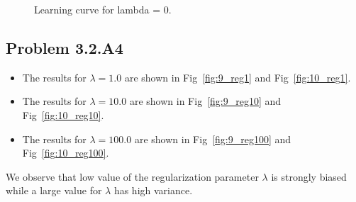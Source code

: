 \documentclass{article}
\begin{document}
\begin{figure}
  \caption{Learning curve for lambda = 0.}\label{fig:10}
\end{figure}

\subsection{Problem 3.2.A4}
\begin{itemize}
\item The results for $\lambda = 1.0$ are shown in Fig~\ref{fig:9_reg1} and Fig~\ref{fig:10_reg1}.
\item The results for $\lambda = 10.0$ are shown in Fig~\ref{fig:9_reg10} and Fig~\ref{fig:10_reg10}.
\item The results for $\lambda = 100.0$ are shown in Fig~\ref{fig:9_reg100} and Fig~\ref{fig:10_reg100}.
\end{itemize}

We observe that low value of the regularization parameter $\lambda$ is strongly biased while a large value
for $\lambda$ has high variance.
\end{document}
